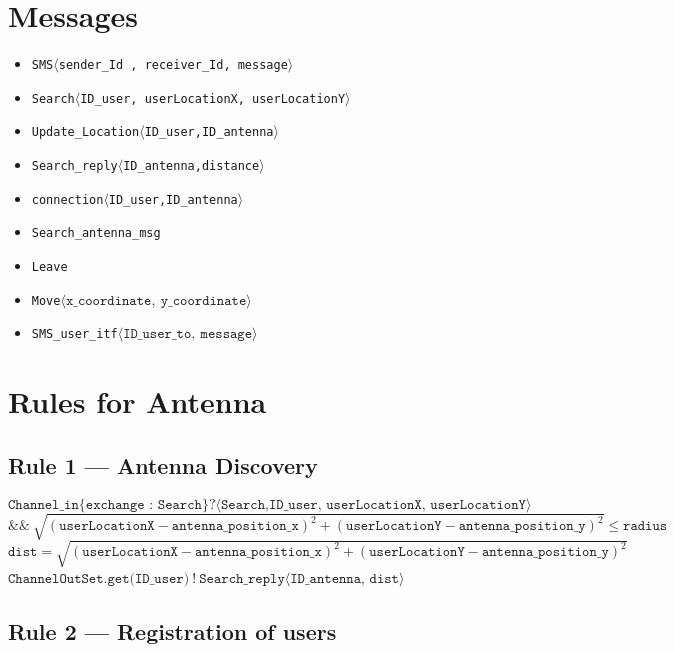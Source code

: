 \documentclass[a4paper,11pt]{article}
\begin{document}
\section*{Messages}

\begin{itemize}
  \item \texttt{SMS$\langle$sender\_Id , receiver\_Id, message$\rangle$}
  \item \texttt{Search$\langle$ID\_user, userLocationX, userLocationY$\rangle$}
  \item \texttt{Update\_Location$\langle$ID\_user,ID\_antenna$\rangle$}
  \item \texttt{Search\_reply$\langle$ID\_antenna,distance$\rangle$}
  \item \texttt{connection$\langle$ID\_user,ID\_antenna$\rangle$}
  \item \texttt{Search\_antenna\_msg}
  \item \texttt{Leave}
  \item \texttt{Move$\langle\texttt{x\_coordinate},\ \texttt{y\_coordinate}\rangle$}
  \item \texttt{\texttt{SMS\_user\_itf}$\langle\texttt{ID\_user\_to},\ \texttt{message}\rangle$}
\end{itemize}

\section*{Rules for Antenna}

\subsection*{Rule 1 — Antenna Discovery}

\[
\texttt{Channel\_in}\{\texttt{exchange : Search}\} ? \langle\texttt{Search,ID\_user, userLocationX, userLocationY}\rangle
\]
\[
\&\&\ \sqrt{(\texttt{userLocationX} - \texttt{antenna\_position\_x})^2 + (\texttt{userLocationY} - \texttt{antenna\_position\_y})^2} \leq \texttt{radius}
\]
\hspace*{3em}$\texttt{dist} = \sqrt{(\texttt{userLocationX} - \texttt{antenna\_position\_x})^2 + (\texttt{userLocationY} - \texttt{antenna\_position\_y})^2}$
\hspace*{3em}$\texttt{ChannelOutSet.get(ID\_user)}\ !\  \texttt{Search\_reply}\langle\texttt{ID\_antenna, dist}\rangle$

\subsection*{Rule 2 — Registration of users}
\end{document}
